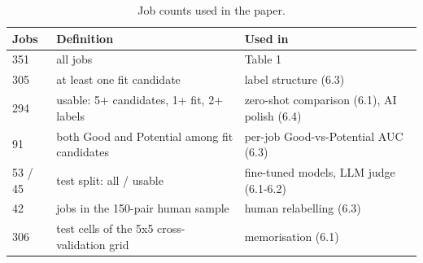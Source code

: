 \begin{table}
\caption{Job counts used in the paper.}
\label{tab:t1a_job_counts}
\begin{tabular}{lll}
\toprule
Jobs & Definition & Used in \\
\midrule
351 & all jobs & Table 1 \\
305 & at least one fit candidate & label structure (6.3) \\
294 & usable: 5+ candidates, 1+ fit, 2+ labels & zero-shot comparison (6.1), AI polish (6.4) \\
91 & both Good and Potential among fit candidates & per-job Good-vs-Potential AUC (6.3) \\
53 / 45 & test split: all / usable & fine-tuned models, LLM judge (6.1-6.2) \\
42 & jobs in the 150-pair human sample & human relabelling (6.3) \\
306 & test cells of the 5x5 cross-validation grid & memorisation (6.1) \\
\bottomrule
\end{tabular}
\end{table}
